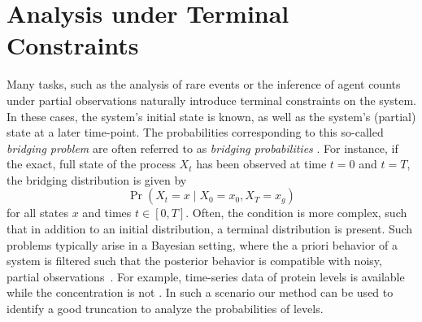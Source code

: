 \chapter{Analysis under Terminal Constraints}\label{ch:bridging}
Many tasks, such as the analysis of rare events or the inference of
agent counts under partial observations naturally introduce terminal
constraints on the system.
In these cases, the system's initial state is known, as well as the
system's (partial) state at a later time-point.
The probabilities corresponding to this so-called \emph{bridging
problem} are often referred to as \emph{bridging probabilities}
\parencite{golightly2019efficient,golightly2011bayesian}.
For instance, if the exact, full state of the process $X_t$ has been
observed at time $t=0$ and $t=T$, the bridging distribution is given by
\[
  \Pr(X_t=x\mid X_{0}=x_{0},X_{T}=x_g)
\]
for all states $x$ and times $t\in [0,T]$.
Often, the condition is more complex, such that in addition to an
initial distribution, a terminal distribution is present.
Such problems typically arise in a Bayesian setting, where the a
priori behavior of a system is filtered such that the posterior
behavior is compatible with noisy, partial
observations~\parencite{broemeling2017bayesian,huang2016reconstructing}.
For example, time-series data of protein levels is available while
the  concentration is not
\parencite{adan2017flow,huang2016reconstructing}.
In such a scenario our method can be used to identify a good
truncation to analyze the probabilities of  levels.

